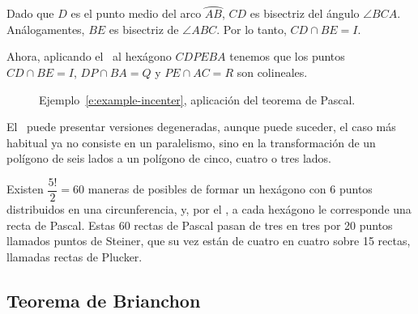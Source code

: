 \begin{solution}
    Dado que $D$ es el punto medio del arco $\wideparen{AB}$, $CD$ es bisectriz del ángulo $\angle BCA$.
    Análogamentes, $BE$ es bisectriz de $\angle ABC$.
    Por lo tanto, $CD \cap BE = I$.

    Ahora, aplicando el~ al hexágono $CDPEBA$ tenemos que los puntos $CD \cap BE = I$, $DP \cap BA = Q$ y $PE \cap AC = R$ son colineales.
\end{solution}

\begin{figure}[H]
    \centering
    
    \caption{Ejemplo~\ref{e:example-incenter}, aplicación del teorema de Pascal.}
\end{figure}


El~ puede presentar versiones degeneradas, aunque puede suceder, el caso más habitual ya no consiste en un paralelismo, sino en la transformación de un polígono de seis lados a un polígono de cinco, cuatro o tres lados.



%    


Existen $\dfrac{5!}{2} = 60$ maneras de posibles de formar un hexágono con 6 puntos distribuidos en una circunferencia, y, por el , a cada hexágono le corresponde una recta de Pascal.
Estas 60 rectas de Pascal pasan de tres en tres por 20 puntos llamados puntos de Steiner, que su vez están de cuatro en cuatro sobre 15 rectas, llamadas rectas de Plucker.



\subsection{Teorema de Brianchon}

